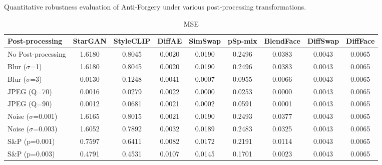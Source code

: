 \documentclass{article}
\begin{document}
\begin{table}[h!]
\caption{Quantitative robustness evaluation of Anti-Forgery under various post-processing transformations.}
\label{tab:robust_anti}
\centering
\small

\begin{subtable}{\textwidth}
\caption{MSE}
\centering
\scriptsize
\begin{tabular}{lcccccccc}
\toprule
\textbf{Post-processing} & StarGAN & StyleCLIP & DiffAE & SimSwap & pSp-mix & BlendFace & DiffSwap & DiffFace \\
\midrule
No Post-processing & 1.6180 & 0.8045 & 0.0020 & 0.0190 & 0.2496 & 0.0383 & 0.0043 & 0.0065 \\
\midrule
Blur ($\sigma$=1) & 1.6180 & 0.8045 & 0.0020 & 0.0190 & 0.2496 & 0.0383 & 0.0043 & 0.0065 \\
Blur ($\sigma$=3) & 0.0130 & 0.1248 & 0.0041 & 0.0007 & 0.0955 & 0.0066 & 0.0043 & 0.0065 \\
JPEG (Q=70) & 0.0016 & 0.0279 & 0.0022 & 0.0000 & 0.0253 & 0.0000 & 0.0043 & 0.0065 \\
JPEG (Q=90) & 0.0012 & 0.0681 & 0.0021 & 0.0002 & 0.0591 & 0.0001 & 0.0043 & 0.0065 \\
Noise ($\sigma$=0.001) & 1.6165 & 0.8015 & 0.0021 & 0.0190 & 0.2493 & 0.0377 & 0.0043 & 0.0065 \\
Noise ($\sigma$=0.003) & 1.6052 & 0.7892 & 0.0032 & 0.0189 & 0.2483 & 0.0325 & 0.0043 & 0.0065 \\
S\&P (p=0.001) & 0.7597 & 0.6411 & 0.0082 & 0.0172 & 0.2191 & 0.0114 & 0.0043 & 0.0065 \\
S\&P (p=0.003) & 0.4791 & 0.4531 & 0.0107 & 0.0145 & 0.1701 & 0.0023 & 0.0043 & 0.0065 \\
\bottomrule
\end{tabular}
\end{subtable}


\end{table}
\end{document}
